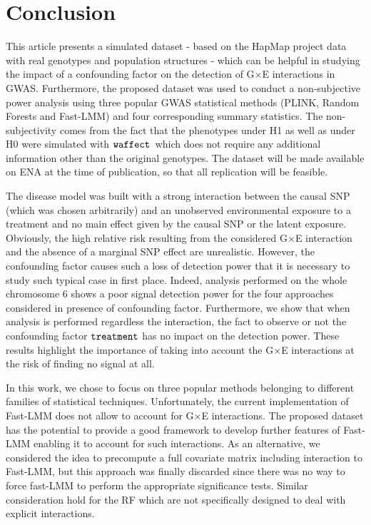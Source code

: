 \documentclass[10pt,a4paper]{article}
\newcommand{\waffect}{${\tt waffect}$\ }
\begin{document}
\newpage			

\section{Conclusion}

This article presents a simulated dataset - based on the HapMap project data with real genotypes and population structures - which can be helpful in studying the impact of a confounding factor on the detection of G$\times$E interactions in GWAS. Furthermore, the proposed dataset was used to conduct a non-subjective power analysis using three popular GWAS statistical methods (PLINK, Random Forests and Fast-LMM) and four corresponding summary statistics. The non-subjectivity comes from the fact that the phenotypes under H1 as well as under H0 were simulated with \waffect which does not require any additional information other than the original genotypes. The dataset will be made available on ENA at the time of publication, so that all replication will be feasible.

The disease model was built with a strong interaction between the causal SNP (which was chosen arbitrarily) and an unobserved environmental exposure to a treatment and no main effect given by the causal SNP or the latent exposure. Obviously, the high relative risk resulting from the considered G$\times$E interaction and the absence of a marginal SNP effect are unrealistic. However, the confounding factor causes such a loss of detection power that it is necessary to study such typical case in first place. Indeed, analysis performed on the whole chromosome 6 shows a poor signal detection power for the four approaches considered in presence of confounding factor. Furthermore, we show that when analysis is performed regardless the interaction, the fact to observe or not the confounding factor $\tt{treatment}$ has no impact on the detection power. These results highlight the importance of taking into account the G$\times$E interactions at the risk of finding no signal at all.

In this work, we chose to focus on three popular methods belonging to different families of statistical techniques. 
Unfortunately, the current implementation of Fast-LMM does not allow to account for G$\times$E interactions. The proposed dataset has the potential to provide a good framework to develop further features of Fast-LMM enabling it to account for such interactions. As an alternative, we considered the idea to precompute a full covariate matrix including interaction to Fast-LMM, but this approach was finally discarded since there was no way to force fast-LMM to perform the appropriate significance tests. Similar consideration hold for the RF which are not specifically designed to deal with explicit interactions.
\end{document}
